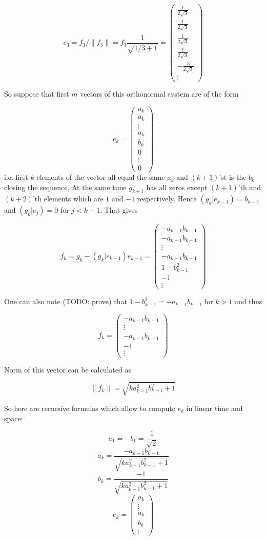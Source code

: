 \documentclass{article}
\begin{document}
    $$e_3 = f_3 / \|f_3\| = f_3 \frac{1}{\sqrt{1/3 + 1}} =
\begin{pmatrix}
    \frac{1}{2\sqrt3} \\ \frac{1}{2\sqrt3} \\ \frac{1}{2\sqrt3} \\ \frac{1}{2\sqrt3} \\ - \frac{3}{2\sqrt3} \\ \vdots
\end{pmatrix}$$

So suppose that first $m$ vectors of this orthonormal system
are of the form

$$ e_k =
\begin{pmatrix}
    a_k \\ a_k \\ \vdots \\ a_k \\ b_k \\ 0 \\ \vdots \\ 0
\end{pmatrix}$$
i.e. first $k$ elements of the vector all equal the same $a_k$
and $(k+1)$'st is the $b_k$ closing the sequence.
At the same time $g_{k+1}$ has all zeros
except $(k+1)$'th and $(k+2)$'th elements which are $1$ and $-1$ respectively.
Hence $\left(g_k|e_{k-1}\right) = b_{k-1}$ and $\left(g_k|e_j\right) = 0$ for $j < k-1$.
That gives

$$f_k = g_k - \left(g_k|e_{k-1}\right) e_{k-1} =
\begin{pmatrix}
    - a_{k-1} b_{k-1} \\
    - a_{k-1} b_{k-1} \\
    \vdots \\
    - a_{k-1} b_{k-1} \\
    1 - b_{k-1}^2     \\
    -1 \\
    \vdots
\end{pmatrix}$$

One can also note (TODO: prove) that
$1 - b_{k-1}^2 = - a_{k-1} b_{k-1}$ for $k>1$
and thus

$$f_k =
\begin{pmatrix}
    - a_{k-1} b_{k-1} \\
    \vdots \\
    - a_{k-1} b_{k-1} \\
    -1 \\
    \vdots
\end{pmatrix}$$

Norm of this vector can be calculated as

\providecommand{\fknorm}{\sqrt{k a_{k-1}^2 b_{k-1}^2 + 1}}
$$\|f_k\| =
\fknorm$$

So here are recursive formulas which allow to compute $e_k$ in linear time and space:

$$a_1 = - b_1 = \frac1{\sqrt2}$$
$$a_k = \frac{- a_{k-1} b_{k-1}}{\fknorm}$$
$$b_k = \frac{-1}{\fknorm}$$
$$ e_k =
\begin{pmatrix}
    a_k \\ \vdots \\ a_k \\ b_k \\ \vdots
\end{pmatrix}$$
\end{document}
